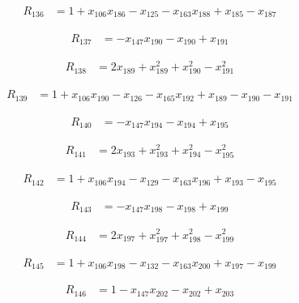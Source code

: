 \begin{align*}
R_{136} &= 1 +x_{106} x_{186} -x_{125} -x_{163} x_{188} +x_{185} -x_{187}
\end{align*}

\begin{align*}
R_{137} &= -x_{147} x_{190} -x_{190} +x_{191}
\end{align*}

\begin{align*}
R_{138} &= 2 x_{189} +x_{189}^{2} +x_{190}^{2} -x_{191}^{2}
\end{align*}

\begin{align*}
R_{139} &= 1 +x_{106} x_{190} -x_{126} -x_{165} x_{192} +x_{189} -x_{190} -x_{191}
\end{align*}

\begin{align*}
R_{140} &= -x_{147} x_{194} -x_{194} +x_{195}
\end{align*}

\begin{align*}
R_{141} &= 2 x_{193} +x_{193}^{2} +x_{194}^{2} -x_{195}^{2}
\end{align*}

\begin{align*}
R_{142} &= 1 +x_{106} x_{194} -x_{129} -x_{163} x_{196} +x_{193} -x_{195}
\end{align*}

\begin{align*}
R_{143} &= -x_{147} x_{198} -x_{198} +x_{199}
\end{align*}

\begin{align*}
R_{144} &= 2 x_{197} +x_{197}^{2} +x_{198}^{2} -x_{199}^{2}
\end{align*}

\begin{align*}
R_{145} &= 1 +x_{106} x_{198} -x_{132} -x_{163} x_{200} +x_{197} -x_{199}
\end{align*}

\begin{align*}
R_{146} &= 1 -x_{147} x_{202} -x_{202} +x_{203}
\end{align*}

